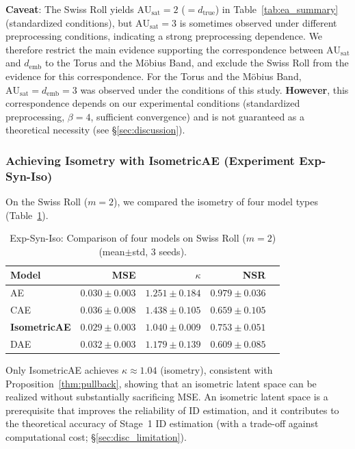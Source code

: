 \documentclass[make,article,submit,pdftex,moreauthors]{Definitions/mdpi}
\newcommand{\dtrue}{d_{\mathrm{true}}}
\newcommand{\kap}{\kappa}
\newcommand{\AUsat}{\mathrm{AU}_{\mathrm{sat}}}
\newcommand{\demb}{d_{\mathrm{emb}}}
\begin{document}
\textbf{Caveat}: The Swiss Roll yields $\AUsat=2$ ($= \dtrue$) in Table~\ref{tab:ea_summary} (standardized conditions),
but $\AUsat=3$ is sometimes observed under different preprocessing conditions,
indicating a strong preprocessing dependence.
We therefore restrict the main evidence supporting the correspondence between $\AUsat$ and $\demb$
to the Torus and the M\"obius Band, and exclude the Swiss Roll from the evidence for this correspondence.
For the Torus and the M\"obius Band, $\AUsat = \demb = 3$ was observed under the conditions of this study.
\textbf{However}, this correspondence depends on our experimental conditions
(standardized preprocessing, $\beta = 4$, sufficient convergence)
and is not guaranteed as a theoretical necessity (see \S\ref{sec:discussion}).

\subsubsection{Achieving Isometry with IsometricAE (Experiment Exp-Syn-Iso)}

On the Swiss Roll ($m = 2$), we compared the isometry of four model types (Table~\ref{tab:ec}).

\begin{table}[H]
\centering
\caption{Exp-Syn-Iso: Comparison of four models on Swiss Roll ($m=2$) (mean$\pm$std, 3 seeds).}
\label{tab:ec}
\small
\begin{tabular}{lrrrr}
\toprule
Model & MSE & $\kap$ & NSR \\
\midrule
AE & $0.030\pm0.003$ & $1.251\pm0.184$ & $0.979\pm0.036$ \\
CAE & $0.036\pm0.008$ & $1.438\pm0.105$ & $0.659\pm0.105$ \\
\textbf{IsometricAE} & $\boldsymbol{0.029\pm0.003}$ & $\boldsymbol{1.040\pm0.009}$ & $0.753\pm0.051$ \\
DAE & $0.032\pm0.003$ & $1.179\pm0.139$ & $0.609\pm0.085$ \\
\bottomrule
\end{tabular}
\end{table}

Only IsometricAE achieves $\kap \approx 1.04$ (isometry), consistent with Proposition~\ref{thm:pullback},
showing that an isometric latent space can be realized without substantially sacrificing MSE.
An isometric latent space is a prerequisite that improves the reliability of ID estimation,
and it contributes to the theoretical accuracy of Stage~1 ID estimation
(with a trade-off against computational cost; \S\ref{sec:disc_limitation}).
\end{document}
